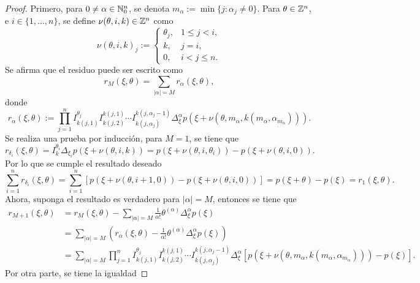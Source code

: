 \begin{proof}
	Primero, para $0\neq\alpha\in\mathbb{N}^n_0$, se denota $m_\alpha := \min\{j:\alpha_j\neq0\}$. Para $\theta\in\mathbb{Z}^n$, e $i\in\{1,\ldots,n\}$, se define $\nu(\theta,i,k)\in\mathbb{Z}^n$ como
	\begin{equation*}
		\nu(\theta,i,k)_j :=\begin{cases}
			\theta_j, & 1\leq j<i,\\
			k, & j=i,\\
			0, &i<j\leq n.
		\end{cases}
	\end{equation*}
	Se afirma que el residuo puede ser escrito como 
	\begin{equation*}
		r_M(\xi, \theta) = \sum_{|\alpha|=M}r_\alpha(\xi, \theta),
	\end{equation*}
	donde 
	\begin{equation*}
		r_\alpha(\xi, \theta) := \prod_{j=1}^n I^{\theta_j}_{k(j, 1)} I^{k(j, 1)}_{k(j, 2)} \cdots I^{k(j, \alpha_j-1)}_{k(j, \alpha_j)} \Delta^\alpha_\xi p(\xi + \nu(\theta, m_\alpha, k(m_\alpha, \alpha_{m_\alpha}))).
	\end{equation*}
	Se realiza una prueba por inducción, para $M=1$, se tiene que
	\begin{equation*}
		r_{\delta_i}(\xi, \theta) = I^{\theta_i}_k\Delta_{\xi_i} p(\xi + \nu(\theta, i, k)) = p(\xi + \nu(\theta, i, \theta_i)) - p(\xi + \nu(\theta, i, 0)).
	\end{equation*}
	Por lo que se cumple el resultado deseado
	\begin{equation*}
		\sum_{i=1}^n r_{\delta_i}(\xi, \theta)  = \sum_{i=1}^n [p(\xi + \nu(\theta, i+1, 0)) - p(\xi + \nu(\theta, i, 0))] = p(\xi+\theta) - p(\xi) = r_1(\xi, \theta).
	\end{equation*}
	Ahora, suponga el resultado es verdadero para $|\alpha|=M$, entonces se tiene que
	\begin{align*}
		r_{M+1}(\xi,\theta) & = r_M(\xi,\theta) - \sum_{|\alpha|=M}\frac{1}{\alpha!} \theta^{(\alpha)}\Delta^\alpha_\xi p(\xi) \\
		& = \sum_{|\alpha|=M} \left( r_\alpha(\xi,\theta) - \frac{1}{\alpha!} \theta^{(\alpha)}\Delta^\alpha_\xi p(\xi) 
		\right) \\
		& = \sum_{|\alpha|=M} \prod_{j=1}^n I^{\theta_j}_{k(j, 1)} I^{k(j, 1)}_{k(j, 2)} \cdots I^{k(j, \alpha_j-1)}_{k(j, \alpha_j)} \Delta^\alpha_\xi [p(\xi + \nu(\theta, m_\alpha, k(m_\alpha, \alpha_{m_\alpha}))) - p(\xi)].
	\end{align*}
	Por otra parte, se tiene la igualdad 

\end{proof}
